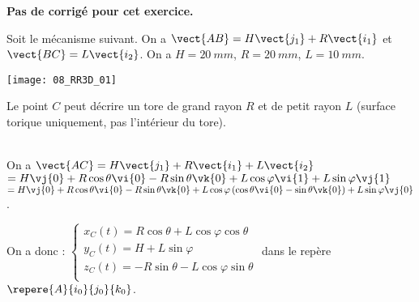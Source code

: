 \normalfalse \difficiletrue \tdifficilefalse
\correctiontrue


\setcounter{question}{0}
\ifcorrection
\else
\textbf{Pas de corrigé pour cet exercice.}
\fi

\ifprof
\else
Soit le mécanisme suivant. On a $\vect{AB}=H\vect{j_1}+R\vect{i_1}$ et $\vect{BC}=L\vect{i_2}$. On a $H=\SI{20}{mm}$, $R=\SI{20}{mm}$, $L=\SI{10}{mm}$. 
\begin{center}
\texttt{[image: 08\_RR3D\_01]}
\end{center}
\fi


\ifprof
\else
{}
\fi
\ifprof
Le point $C$ peut décrire un tore de grand rayon $R$ et de petit rayon $L$ (surface torique uniquement, pas l'intérieur du tore). 
\else
\fi

\ifprof ~\\
On  a  $\vect{AC}=H\vect{j_1}+R\vect{i_1}+L\vect{i_2}$ $=H\vj{0}+R\cos\theta\vi{0}-R\sin\theta\vk{0}+L\cos\varphi\vi{1}+L\sin\varphi\vj{1}$ 
$=H\vj{0}+R\cos\theta\vi{0}-R\sin\theta\vk{0}+L\cos\varphi\left(\cos\theta\vi{0}-\sin\theta\vk{0} \right)+L\sin\varphi\vj{0}$ .

On a donc :
$\left\{
\begin{array}{l}
x_C(t)=R\cos\theta+L\cos\varphi\cos\theta \\
y_C(t)= H+L\sin\varphi\\
z_C(t)=  -R\sin\theta-L\cos\varphi\sin\theta\\
\end{array}
\right.
$ dans le repère $\repere{A}{i_0}{j_0}{k_0}$.
\else
\fi
